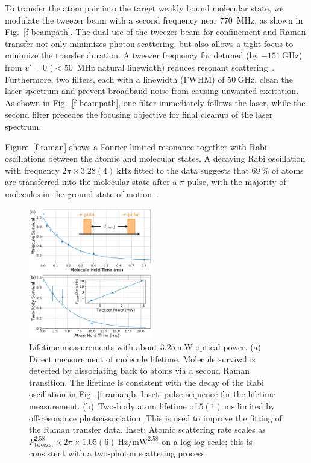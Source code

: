 \documentclass[aps,prx,twocolumn,10pt,superscriptaddress]{revtex4-2}
\begin{document}
To transfer the atom pair into the target weakly bound molecular state,
we modulate the tweezer beam with a second frequency near $770$~MHz, as shown in Fig.~\ref{f-beampath}.
The dual use of the tweezer beam for confinement and Raman transfer not only minimizes photon scattering,
but also allows a tight focus to minimize the transfer duration. A tweezer frequency far detuned (by $-151~\mathrm{GHz}$) from $v' = 0 $ ($<50$~MHz natural linewidth) reduces resonant scattering~\cite{Liu2019}.
Furthermore, two filters, each with a linewidth (FWHM) of $50~\mathrm{GHz}$,
clean the laser spectrum and prevent broadband noise from causing unwanted excitation.
As shown in Fig.~\ref{f-beampath}, one filter immediately follows the laser, while the second filter precedes the focusing objective for final cleanup of the laser spectrum.

Figure~\ref{f-raman} shows a Fourier-limited resonance together with Rabi oscillations between the atomic and molecular states.
A decaying Rabi oscillation with frequency $2\pi\times3.28(4)~\mathrm{kHz}$ fitted to the data suggests that
$69~\mathrm{\%}$ of atoms are transferred into the molecular state after a $\pi$-pulse, with the majority of molecules in the ground state of motion~\cite{Zhang2020,He331}.

\begin{figure}[ht]
  \includegraphics[width=0.48\textwidth]{fig-lifetime.pdf}
  \caption{Lifetime measurements with about $3.25~\mathrm{mW}$ optical power.
    (a) Direct measurement of molecule lifetime.
    Molecule survival is detected by dissociating back to atoms via a second Raman transition.
    The lifetime is consistent with the decay of the Rabi oscillation in Fig.~\ref{f-raman}b.
    Inset: pulse sequence for the lifetime measurement.
    (b)~Two-body atom lifetime of $5(1)~\mathrm{ms}$
    limited by off-resonance photoassociation.
    This is used to improve the fitting of the Raman transfer data.
    Inset: Atomic scattering rate scales as
    $P_{\mathrm{tweezer}}^{2.58}\times\!2\pi\!\times1.05(6)~\mathrm{Hz/mW^{2.58}}$ on a log-log scale;
    this is consistent with a two-photon scattering process.
    \label{f-lifetime}}
\end{figure}
\end{document}
